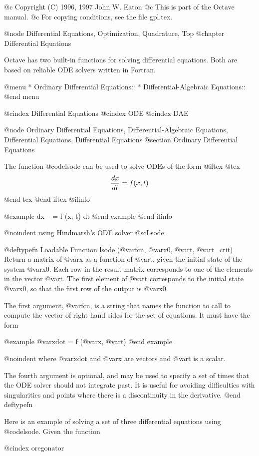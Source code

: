 @c Copyright (C) 1996, 1997 John W. Eaton
@c This is part of the Octave manual.
@c For copying conditions, see the file gpl.tex.

@node Differential Equations, Optimization, Quadrature, Top
@chapter Differential Equations

Octave has two built-in functions for solving differential equations.
Both are based on reliable ODE solvers written in Fortran.

@menu
* Ordinary Differential Equations::  
* Differential-Algebraic Equations::  
@end menu

@cindex Differential Equations
@cindex ODE
@cindex DAE

@node Ordinary Differential Equations, Differential-Algebraic Equations, Differential Equations, Differential Equations
@section Ordinary Differential Equations

The function @code{lsode} can be used to solve ODEs of the form
@iftex
@tex
$$
 {dx\over dt} = f (x, t)
$$
@end tex
@end iftex
@ifinfo

@example
dx
-- = f (x, t)
dt
@end example
@end ifinfo

@noindent
using Hindmarsh's ODE solver @sc{Lsode}.

@deftypefn {Loadable Function} {} lsode (@var{fcn}, @var{x0}, @var{t}, @var{t_crit})
Return a matrix of @var{x} as a function of @var{t}, given the initial
state of the system @var{x0}.  Each row in the result matrix corresponds
to one of the elements in the vector @var{t}.  The first element of
@var{t} corresponds to the initial state @var{x0}, so that the first row
of the output is @var{x0}.

The first argument, @var{fcn}, is a string that names the function to
call to compute the vector of right hand sides for the set of equations.
It must have the form

@example
@var{xdot} = f (@var{x}, @var{t})
@end example

@noindent
where @var{xdot} and @var{x} are vectors and @var{t} is a scalar.

The fourth argument is optional, and may be used to specify a set of
times that the ODE solver should not integrate past.  It is useful for
avoiding difficulties with singularities and points where there is a
discontinuity in the derivative.
@end deftypefn

Here is an example of solving a set of three differential equations using
@code{lsode}.  Given the function

@cindex oregonator


